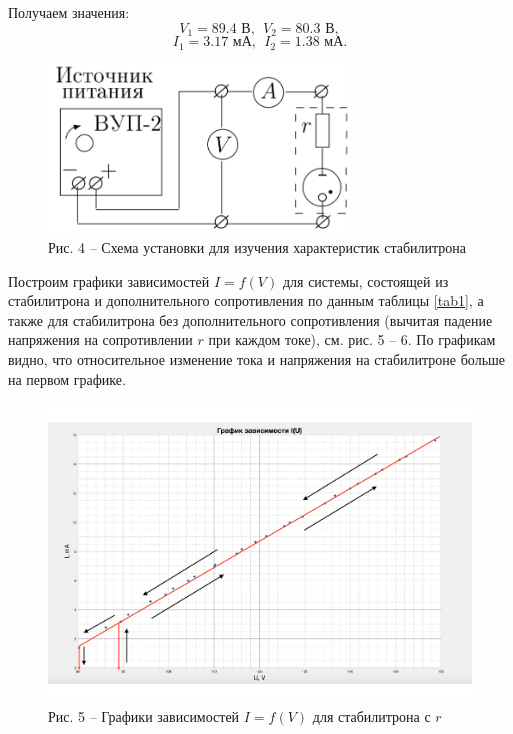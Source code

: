 \documentclass[a4paper,14pt]{article}
\begin{document}
Получаем значения: $$V_1 = 89.4 \text{ В},  \ \ V_2 = 80.3 \text{ В}, $$ $$I_1 = 3.17 \text{ мА}, \ \  I_2 = 1.38 \text{ мА}.$$

\begin{figure}[!h]
	\centering
	\includegraphics[width = 8cm]{4} \\
	Рис. 4 -- Схема установки для изучения характеристик стабилитрона
\end{figure}

Построим графики зависимостей $I= f(V)$ для системы, состоящей из стабилитрона и дополнительного сопротивления по данным таблицы \ref{tab1}, а также для стабилитрона без дополнительного сопротивления (вычитая падение напряжения на сопротивлении $r$ при каждом токе), см. рис. 5 -- 6. По графикам видно, что относительное изменение тока и напряжения на стабилитроне больше на первом графике.

\begin{center}
\begin{figure}[bhtp]
	\centering
	\includegraphics[width=0.85\linewidth]{gg1.pdf} \\
	Рис. 5 -- Графики зависимостей $I = f(V)$ для стабилитрона с $r$
\end{figure}
\end{center}
\end{document}
